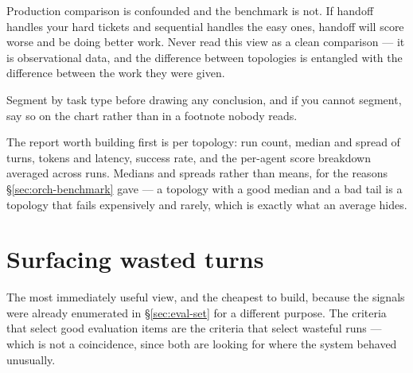 \begin{warning}
Production comparison is confounded and the benchmark is not. If handoff handles
your hard tickets and sequential handles the easy ones, handoff will score worse
and be doing better work. Never read this view as a clean comparison --- it is
observational data, and the difference between topologies is entangled with the
difference between the work they were given.

Segment by task type before drawing any conclusion, and if you cannot segment,
say so on the chart rather than in a footnote nobody reads.
\end{warning}

The report worth building first is per topology: run count, median and spread of
turns, tokens and latency, success rate, and the per-agent score breakdown
averaged across runs. Medians and spreads rather than means, for the reasons
\S\ref{sec:orch-benchmark} gave --- a topology with a good median and a bad tail
is a topology that fails expensively and rarely, which is exactly what an
average hides.


\section{Surfacing wasted turns}
\label{sec:cap-waste}

The most immediately useful view, and the cheapest to build, because the signals
were already enumerated in \S\ref{sec:eval-set} for a different purpose. The
criteria that select good evaluation items are the criteria that select wasteful
runs --- which is not a coincidence, since both are looking for where the system
behaved unusually.

